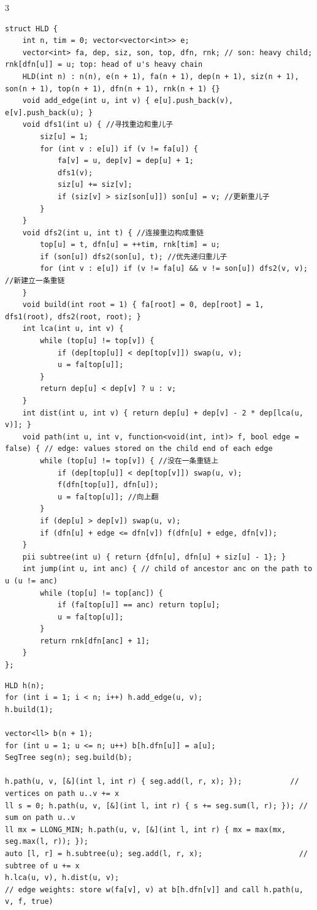 \documentclass[8pt]{extarticle}
\begin{document}
\begin{multicols*}{3}
\begin{lstlisting}
struct HLD {
    int n, tim = 0; vector<vector<int>> e;
    vector<int> fa, dep, siz, son, top, dfn, rnk; // son: heavy child; rnk[dfn[u]] = u; top: head of u's heavy chain
    HLD(int n) : n(n), e(n + 1), fa(n + 1), dep(n + 1), siz(n + 1), son(n + 1), top(n + 1), dfn(n + 1), rnk(n + 1) {}
    void add_edge(int u, int v) { e[u].push_back(v), e[v].push_back(u); }
    void dfs1(int u) { //寻找重边和重儿子
        siz[u] = 1;
        for (int v : e[u]) if (v != fa[u]) {
            fa[v] = u, dep[v] = dep[u] + 1;
            dfs1(v);
            siz[u] += siz[v];
            if (siz[v] > siz[son[u]]) son[u] = v; //更新重儿子
        }
    }
    void dfs2(int u, int t) { //连接重边构成重链
        top[u] = t, dfn[u] = ++tim, rnk[tim] = u;
        if (son[u]) dfs2(son[u], t); //优先递归重儿子
        for (int v : e[u]) if (v != fa[u] && v != son[u]) dfs2(v, v); //新建立一条重链
    }
    void build(int root = 1) { fa[root] = 0, dep[root] = 1, dfs1(root), dfs2(root, root); }
    int lca(int u, int v) {
        while (top[u] != top[v]) {
            if (dep[top[u]] < dep[top[v]]) swap(u, v);
            u = fa[top[u]];
        }
        return dep[u] < dep[v] ? u : v;
    }
    int dist(int u, int v) { return dep[u] + dep[v] - 2 * dep[lca(u, v)]; }
    void path(int u, int v, function<void(int, int)> f, bool edge = false) { // edge: values stored on the child end of each edge
        while (top[u] != top[v]) { //没在一条重链上
            if (dep[top[u]] < dep[top[v]]) swap(u, v);
            f(dfn[top[u]], dfn[u]);
            u = fa[top[u]]; //向上翻
        }
        if (dep[u] > dep[v]) swap(u, v);
        if (dfn[u] + edge <= dfn[v]) f(dfn[u] + edge, dfn[v]);
    }
    pii subtree(int u) { return {dfn[u], dfn[u] + siz[u] - 1}; }
    int jump(int u, int anc) { // child of ancestor anc on the path to u (u != anc)
        while (top[u] != top[anc]) {
            if (fa[top[u]] == anc) return top[u];
            u = fa[top[u]];
        }
        return rnk[dfn[anc] + 1];
    }
};
\end{lstlisting}

\begin{lstlisting}
HLD h(n);
for (int i = 1; i < n; i++) h.add_edge(u, v);
h.build(1);

vector<ll> b(n + 1);
for (int u = 1; u <= n; u++) b[h.dfn[u]] = a[u];
SegTree seg(n); seg.build(b);

h.path(u, v, [&](int l, int r) { seg.add(l, r, x); });           // vertices on path u..v += x
ll s = 0; h.path(u, v, [&](int l, int r) { s += seg.sum(l, r); }); // sum on path u..v
ll mx = LLONG_MIN; h.path(u, v, [&](int l, int r) { mx = max(mx, seg.max(l, r)); });
auto [l, r] = h.subtree(u); seg.add(l, r, x);                      // subtree of u += x
h.lca(u, v), h.dist(u, v);
// edge weights: store w(fa[v], v) at b[h.dfn[v]] and call h.path(u, v, f, true)
\end{lstlisting}


\end{multicols*}
\end{document}
